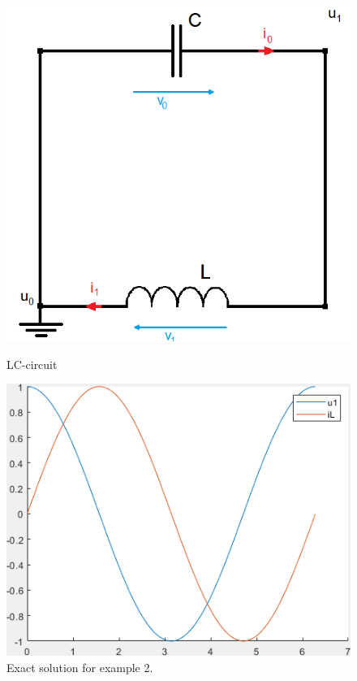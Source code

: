 	\begin{frame}
		\begin{figure}[H]
			\centering
			\begin{minipage}{.5\textwidth}
				\centering
				\includegraphics[width=\linewidth]{../Tex/pictures/Example2_index0.png}
				\caption{LC-circuit}
				\label{fig: LC-circuit}
			\end{minipage}%
			\begin{minipage}{.5\textwidth}
				\centering
				\includegraphics[width=\linewidth]{../Tex/pictures/exact_solution_ex2.png}
				\caption{Exact solution for example 2.}
				\label{fig: Exact solution for example 2}
			\end{minipage}
		\end{figure}
	\end{frame}
	
